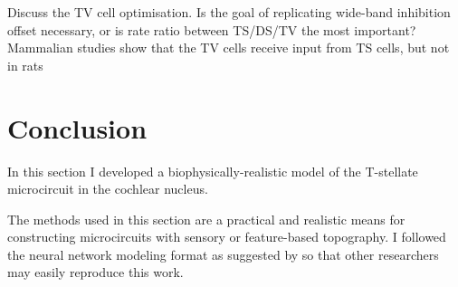 \documentclass[11pt,a4paper,twoside]{book} %
\begin{document}
\medskip{}

Discuss the TV cell optimisation. Is the goal of replicating wide-band
inhibition offset necessary, or is rate ratio between TS/DS/TV the
most important?  Mammalian studies show that the TV cells receive
input from TS cells, but not in rats


\section{Conclusion}


In this section I developed a biophysically-realistic model of the
T-stellate microcircuit in the cochlear nucleus.

\medskip{}

The methods used in this section are a practical and realistic means
for constructing microcircuits with sensory or feature-based
topography.  I followed the neural network modeling format as
suggested by \citet{NordlieGewaltigEtAl:2009} so that other
researchers may easily reproduce this work.




 
\end{document}
